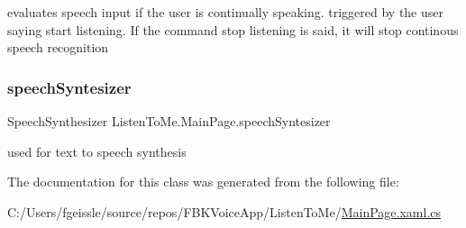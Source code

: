 evaluates speech input if the user is continually speaking. triggered by the user saying start listening. If the command stop listening is said, it will stop continous speech recognition 

\mbox{\label{class_listen_to_me_1_1_main_page_a5d61d66540a58eb612a80a05f2236548}} 
\subsubsection{\texorpdfstring{speech\+Syntesizer}{speechSyntesizer}}
{\footnotesize\ttfamily Speech\+Synthesizer Listen\+To\+Me.\+Main\+Page.\+speech\+Syntesizer\hspace{0.3cm}{\ttfamily [private]}}



used for text to speech synthesis 



The documentation for this class was generated from the following file\+:\begin{DoxyCompactItemize}
\item 
C\+:/\+Users/fgeissle/source/repos/\+F\+B\+K\+Voice\+App/\+Listen\+To\+Me/\mbox{\hyperlink{_main_page_8xaml_8cs}{Main\+Page.\+xaml.\+cs}}\end{DoxyCompactItemize}
